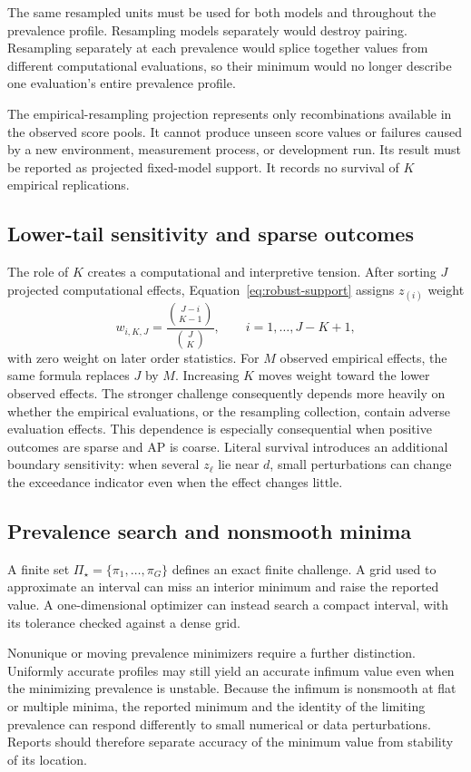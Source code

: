 \documentclass[11pt]{article}
\newcommand{\PSet}{\Pi_\star}
\theoremstyle{remark}
\begin{document}
The same resampled units must be used for both models and throughout the prevalence profile. Resampling models separately would destroy pairing. Resampling separately at each prevalence would splice together values from different computational evaluations, so their minimum would no longer describe one evaluation's entire prevalence profile.

The empirical-resampling projection represents only recombinations available in the observed score pools. It cannot produce unseen score values or failures caused by a new environment, measurement process, or development run. Its result must be reported as projected fixed-model support. It records no survival of $K$ empirical replications.

\subsection{Lower-tail sensitivity and sparse outcomes}

The role of $K$ creates a computational and interpretive tension. After sorting $J$ projected computational effects, Equation~\eqref{eq:robust-support} assigns $z_{(i)}$ weight
\[
w_{i,K,J}
=
\frac{\binom{J-i}{K-1}}{\binom{J}{K}},
\qquad i=1,\ldots,J-K+1,
\]
with zero weight on later order statistics. For $M$ observed empirical
effects, the same formula replaces $J$ by $M$.
Increasing $K$ moves weight toward the lower observed effects. The stronger challenge consequently depends more heavily on whether the empirical evaluations, or the resampling collection, contain adverse evaluation effects. This dependence is especially consequential when positive outcomes are sparse and AP is coarse. Literal survival introduces an additional boundary sensitivity: when several $z_\ell$ lie near $d$, small perturbations can change the exceedance indicator even when the effect changes little.

\subsection{Prevalence search and nonsmooth minima}

A finite set $\PSet=\{\pi_1,\ldots,\pi_G\}$ defines an exact finite challenge. A grid used to approximate an interval can miss an interior minimum and raise the reported value. A one-dimensional optimizer can instead search a compact interval, with its tolerance checked against a dense grid.

Nonunique or moving prevalence minimizers require a further distinction. Uniformly accurate profiles may still yield an accurate infimum value even when the minimizing prevalence is unstable. Because the infimum is nonsmooth at flat or multiple minima, the reported minimum and the identity of the limiting prevalence can respond differently to small numerical or data perturbations. Reports should therefore separate accuracy of the minimum value from stability of its location.
\end{document}
